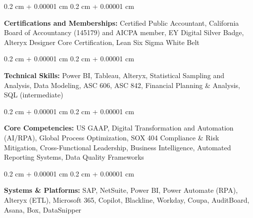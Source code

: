 \documentclass[10pt, letterpaper]{article}
\newenvironment{onecolentry}{
    \begin{adjustwidth}{
        0.2 cm + 0.00001 cm
    }{
        0.2 cm + 0.00001 cm
    }
}{
    \end{adjustwidth}
} %
\begin{document}
        \begin{onecolentry}
            \textbf{Certifications and Memberships:} Certified Public Accountant, California Board of Accountancy (145179) and AICPA member, EY Digital Silver Badge, Alteryx Designer Core Certification, Lean Six Sigma White Belt
        \end{onecolentry}

        \vspace{0.2 cm}

        \begin{onecolentry}
            \textbf{Technical Skills:} Power BI, Tableau, Alteryx, Statistical Sampling and Analysis, Data Modeling, ASC 606, ASC 842, Financial Planning \& Analysis, SQL (intermediate)
        \end{onecolentry}

        \vspace{0.2 cm}

        \begin{onecolentry}
            \textbf{Core Competencies:} US GAAP, Digital Transformation and Automation (AI/RPA), Global Process Optimization, SOX 404 Compliance \& Risk Mitigation, Cross-Functional Leadership, Business Intelligence, Automated Reporting Systems, Data Quality Frameworks
        \end{onecolentry}

        \vspace{0.2 cm}

        \begin{onecolentry}
            \textbf{Systems \& Platforms:} SAP, NetSuite, Power BI, Power Automate (RPA), Alteryx (ETL), Microsoft 365, Copilot, Blackline, Workday, Coupa, AuditBoard, Asana, Box, DataSnipper
        \end{onecolentry}
\end{document}
